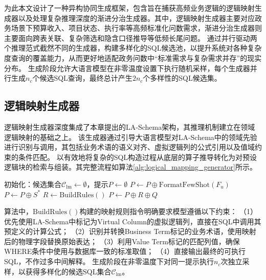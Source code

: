 为此本文设计了一种异构协同生成框架，包含旨在捕获高频业务逻辑的逻辑映射生成器以及处理复杂推理深度的渐进分治生成器。其中，逻辑映射生成器主要对应政务场景下预算收入、项目状态、执行率等高频标准化问数需求，渐进分治生成器则主要面向跨表关联、复杂筛选和隐含口径推导等低频长尾问题。
通过并行驱动两个推理范式截然不同的生成器，构建多样化的SQL候选池，以提升系统对各种复杂度查询的覆盖能力，从而更好地适配政务问数中“标准需求与复杂需求并存”的现实分布。
生成阶段允许大语言模型在非零温度\cite{brown2020gpt3}设置下执行随机采样，每个生成器并行生成$n_c$个候选SQL查询，最终总计产生$2n_c$个多样性的SQL候选集。

\subsection{逻辑映射生成器}

逻辑映射生成器深度集成了本章提出的LA-Schema架构，其推理机制建立在领域逻辑映射的基础之上。
该生成器通过引导大语言模型对LA-Schema中的领域先验进行识别与调用，其包括业务术语的语义对齐、虚拟逻辑列的公式引用以及值域约束的条件匹配。
以有效地将复杂的SQL构造过程从底层的算子推导转化为对预设逻辑块的检索与组装。其完整流程如算法\ref{alg:logical_mapping_generator}所示。

\begin{algorithm}[htbp]
初始化：候选集合$\mathcal{C}_{\text{lm}} \leftarrow \emptyset$，提示$P \leftarrow \emptyset$\;
$P \leftarrow P \oplus \text{FormatFewShot}(F_u)$
$P \leftarrow P \oplus S^{*}$
$R \leftarrow \text{BuildRules}()$
$P \leftarrow P \oplus R \oplus Q$
\caption{逻辑映射生成算法}
\label{alg:logical_mapping_generator}
\end{algorithm}

算法中，$\text{BuildRules}()$构建的映射规则指令明确要求模型遵循以下约束：
（1）优先使用LA-Schema中标记为Virtual Column的虚拟逻辑列，直接在SQL中调用其预定义的计算公式；
（2）识别并转换Business Term标记的业务术语，使用映射后的物理字段替换原始表达；
（3）利用Value Term标记的匹配列值，确保WHERE条件中使用与数据库一致的标准取值；
（4）直接输出最终的可执行SQL，不作过多中间解释。
生成阶段在非零温度下对同一提示执行$n_c$次独立采样，以获得多样化的候选SQL集合$\mathcal{C}_{\text{lm}}$。

